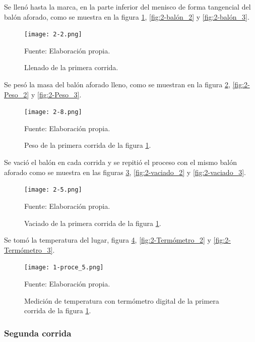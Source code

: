 \documentclass[12pt,letterpaper]{exam}
\begin{document}
\begin{multicols}{2}
Se llenó hasta la marca, en la parte inferior del menisco de forma tangencial del balón aforado, como se muestra en la figura \ref{fig:2-balón_1}, \ref{fig:2-balón_2} y \ref{fig:2-balón_3}.

\begin{figure}[H]
\centering
\texttt{[image: 2-2.png]}
\caption{Llenado de la primera corrida.}
\begin{center}
Fuente: Elaboración propia.
\end{center}
\label{fig:2-balón_1}
\end{figure}

Se pesó la masa del balón aforado lleno, como se muestran en la figura \ref{fig:2-Peso_1}, \ref{fig:2-Peso_2} y \ref{fig:2-Peso_3}.


\begin{figure}[H]
\centering
\texttt{[image: 2-8.png]}
\caption{Peso de la primera corrida de la figura \ref{fig:2-balón_1}.}
\begin{center}
Fuente: Elaboración propia.
\end{center}
\label{fig:2-Peso_1}
\end{figure}

Se vació el balón en cada corrida y se repitió el proceso con el mismo balón aforado como se muestra en las figuras \ref{fig:2-vaciado_1}, \ref{fig:2-vaciado_2} y \ref{fig:2-vaciado_3}.

\begin{figure}[H]
\centering
\texttt{[image: 2-5.png]}
\caption{Vaciado de la primera corrida de la figura \ref{fig:2-balón_1}.}
\begin{center}
Fuente: Elaboración propia.
\end{center}
\label{fig:2-vaciado_1}
\end{figure}

Se tomó la temperatura del lugar, figura \ref{fig:2-Termómetro_1}, \ref{fig:2-Termómetro_2} y \ref{fig:2-Termómetro_3}.

\begin{figure}[H]
\centering
\texttt{[image: 1-proce\_5.png]}
\caption{Medición de temperatura con termómetro digital de la primera corrida de la figura \ref{fig:2-balón_1}.}
\begin{center}
Fuente: Elaboración propia.
\end{center}
\label{fig:2-Termómetro_1}
\end{figure}



\subsubsection{Segunda corrida}


\end{multicols}
\end{document}
